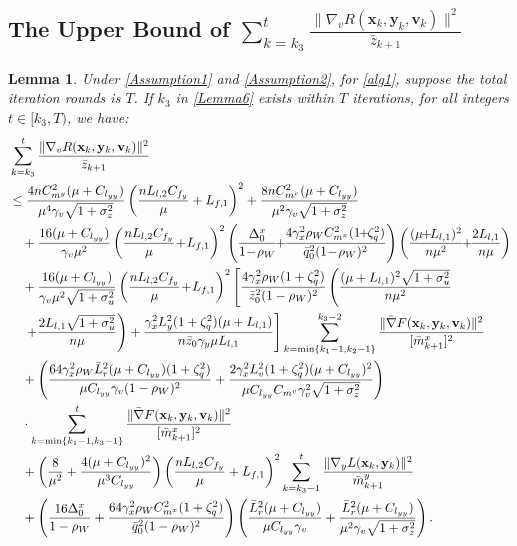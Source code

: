\documentclass{article}
\theoremstyle{plain}
\newtheorem{lemma}[lemma]{Lemma}
\theoremstyle{definition}
\theoremstyle{remark}
\begin{document}
\subsection{The Upper Bound of $\sum_{k=k_3}^t \frac{\|\nabla_v R(\mathbf{x}_k, \mathbf{y}_k, \mathbf{v}_k)\|^2 }{\bar{z}_{k+1}} $}
\begin{lemma}\label{Lemma8} Under \cref{Assumption1} and \cref{Assumption2}, for \cref{alg1}, suppose the total iteration rounds is \(T\). If \(k_3\) in \cref{Lemma6} exists within \(T\) iterations, for all integers \(t \in [k_3, T)\), we have:
\begin{align}
&\sum_{k=k_3}^t \frac{\|\nabla_v R(\mathbf{x}_k, \mathbf{y}_k, \mathbf{v}_k)\|^2 }{\bar{z}_{k+1}} \nonumber\\
&\leq 
\frac{4nC_{m^y}^2(\mu + C_{l_{yy}})}{\mu^4\gamma_v\sqrt{1+\sigma_z^2}}\left(\frac{nL_{l,2}C_{f_y}}{\mu}+L_{f,1}\right)^2 + \frac{8nC_{m^v}^2(\mu + C_{l_{yy}})}{\mu^2\gamma_v\sqrt{1+\sigma_z^2}}\notag \\
&\quad + \frac{16(\mu + C_{l_{yy}})}{\gamma_v\mu^2}\left(\frac{nL_{l,2}C_{f_y}}{\mu}\!+\!L_{f,1}\right)^2 \left(\frac{\Delta_0^x}{1\!-\!\rho_W}\!\!+\!\!\frac{4 \gamma_x^2 \rho_WC_{m^x}^2 (1 \!\!+\!\! \zeta_q^2)}{\bar{q}_0^2(1 \!-\! \rho_W)^2} \right)\left(\frac{(\mu\!\!+\!\!L_{l,1})^2}{n\mu^2 }\!\!+\!\!\frac{2L_{l,1}}{n\mu }\right)\notag \\
&\quad+\frac{16(\mu + C_{l_{yy}})}{\gamma_v\mu^2\sqrt{1+\sigma_u^2}}\left(\frac{nL_{l,2}C_{f_y}}{\mu}\!+\!L_{f,1}\right)^2\left[\frac{4 \gamma_x^2 \rho_W (1 + \zeta_q^2)}{\bar{z}_0^2(1 - \rho_W)^2} \left(\frac{(\mu+L_{l,1})^2\sqrt{1+\sigma_u^2}}{n\mu^2 }\right.\right.\nonumber\\
&\quad\left.\left.+\frac{2L_{l,1}\sqrt{1+\sigma_u^2}}{n\mu }\right) +\frac{\gamma_x^2L_y^2(1+\zeta_q^2)(\mu + L_{l,1})}{n\bar{z}_0\gamma_y \mu L_{l,1}}\right]\sum_{k=\min\{k_1-1,k_2-1\}}^{k_3-2} 
 \frac{\| \bar{\nabla} F(\mathbf{x}_{k},\mathbf{y}_{k},\mathbf{v}_{k})\|^2}{[\bar{m}^x_{k+1}]^2}\nonumber\\
&\quad+ \left(\frac{64 \gamma_x^2 \rho_W \bar{L}_r^2(\mu + C_{l_{yy}})(1 + \zeta_q^2)}{\mu C_{l_{yy}}\gamma_v(1 - \rho_W)^2} + \frac{2\gamma_x^2L_v^2(1+\zeta_q^2)(\mu + C_{l_{yy}})^2}{\mu C_{l_{yy}}C_{m^v}\gamma_v^2\sqrt{1+\sigma_z^2}}\right)\notag\\
&\quad\cdot\sum_{k=\min\{k_1-1,k_3-1\}}^{t} 
 \frac{\| \bar{\nabla} F(\mathbf{x}_{k},\mathbf{y}_{k},\mathbf{v}_{k})\|^2}{[\bar{m}^x_{k+1}]^2}\nonumber\\
&\quad  + \left(\frac{8}{\mu^2}+\frac{4(\mu + C_{l_{yy}})^2}{\mu^3 C_{l_{yy}}} \right)\left(\frac{nL_{l,2}C_{f_y}}{\mu}+L_{f,1}\right)^2 \sum_{k=k_3-1}^t\frac{\|\nabla_y L(\mathbf{x}_k,\mathbf{y}_k)\|^2}{\bar{m}_{k+1}^y}\nonumber\\
&\quad +\left(\frac{16\Delta_0^x}{1-\rho_W}+\frac{64\gamma_x^2\rho_WC_{m^x}^2(1+\zeta_q^2)}{\bar{q}_0^2(1-\rho_W)^2}\right)\left(\frac{ \bar{L}_r^2(\mu + C_{l_{yy}})}{\mu C_{l_{yy}}\gamma_v}+\frac{\bar{L}_r^2(\mu+C_{l_{yy}})}{\mu^2\gamma_v\sqrt{1+\sigma_z^2}}\right).\label{eq68}
\end{align}

\end{lemma}
\end{document}
